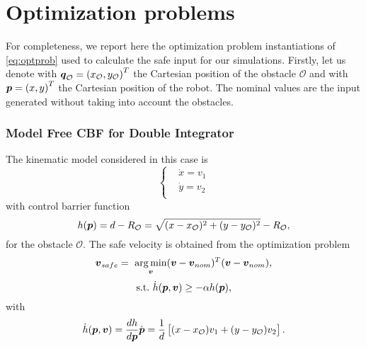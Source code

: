 \appendix
\section{Optimization problems}\label{sec:appendix}
For completeness, we report here the optimization problem instantiations of \eqref{eq:optprob} used to calculate the safe input for our simulations.
Firstly, let us denote with ${\boldsymbol{q}}_\mathcal{O}=\left(x_\mathcal{O}, y_\mathcal{O} \right)^T$ the Cartesian position of the obstacle $\mathcal{O}$ and with $\boldsymbol{p} = \left(x,y\right)^T$ the Cartesian position of the robot. The nominal values are the input generated without taking into account the obstacles.
\subsubsection*{Model Free CBF for Double Integrator}
The kinematic model considered in this case is
\begin{equation*}
\left\{ \begin{aligned}
    &\dot{x}      = v_1 \\
    &\dot{y}      =  v_2 \\
\end{aligned} \right.
\end{equation*}
with control barrier function
\begin{equation*}
    h(\boldsymbol{p})=d-R_{\mathcal{O}}=\sqrt{(x-x_\mathcal{O})^2+(y-y_\mathcal{O})^2}-R_{\mathcal{O}},
\end{equation*}
for the obstacle $\mathcal{O}$. The safe velocity is obtained from the optimization problem
\begin{equation*}
    \boldsymbol{v}_{safe}=~\underset{\boldsymbol{v}}{\arg\min}(\boldsymbol{v}-\boldsymbol{v}_{nom})^T(\boldsymbol{v}-\boldsymbol{v}_{nom}),
\end{equation*}
\begin{equation*}
    \mathrm{s.t.}\,\, \dot{h}(\boldsymbol{p},\boldsymbol{v})\geq -\alpha h(\boldsymbol{p}),
\end{equation*}
with
\begin{equation*}
    \dot{h}(\boldsymbol{p}, \boldsymbol{v}) = \frac{dh}{d\boldsymbol{p}} \dot{\boldsymbol{p}} = \frac{1}{d}\left[(x-x_\mathcal{O})v_1+(y-y_\mathcal{O})v_2\right].
\end{equation*}

